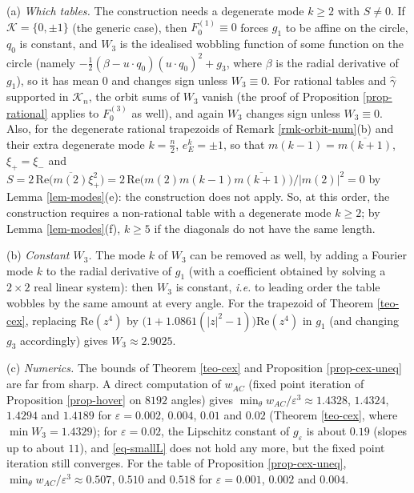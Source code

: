 \documentclass[a4paper,11pt,twoside,leqno]{article}
\newcommand{\ie}[0]{\emph{i.e.} }
\newcommand{\eps}[0]{\varepsilon}
\numberwithin{equation}{section}
\begin{document}
\begin{rmk}\label{rmk-cex-comments}
(a) \emph{Which tables.} The construction needs a degenerate mode $k \geq 2$ with $S \neq 0$. If $\mathcal{K} = \{0, \pm 1\}$ (the generic case), then $F_0^{(1)} \equiv 0$ forces $g_1$ to be affine on the circle, $q_0$ is constant, and $W_3$ is the idealised wobbling function of some function on the circle (namely $-\frac{1}{2}(\beta - u \cdot q_0)(u\cdot q_0)^2 + g_3$, where $\beta$ is the radial derivative of $g_1$), so it has mean $0$ and changes sign unless $W_3 \equiv 0$. For rational tables and $\hat\gamma$ supported in $\mathcal{K}_n$, the orbit sums of $W_3$ vanish (the proof of Proposition \ref{prop-rational} applies to $F_0^{(3)}$ as well), and again $W_3$ changes sign unless $W_3 \equiv 0$. Also, for the degenerate rational trapezoids of Remark \ref{rmk-orbit-num}(b) and their extra degenerate mode $k = \frac{n}{2}$, $e_E^k = \pm 1$, so that $m(k-1) = \overline{m(k+1)}$, $\xi_+ = \xi_-$ and $S = 2\,\mathrm{Re}\big(\overline{m(2)} \xi_+^2\big) = 2\,\mathrm{Re}\big(m(2) m(k-1) \overline{m(k+1)}\big)/|m(2)|^2 = 0$ by Lemma \ref{lem-modes}(e): the construction does not apply. So, at this order, the construction requires a non-rational table with a degenerate mode $k \geq 2$; by Lemma \ref{lem-modes}(f), $k \geq 5$ if the diagonals do not have the same length.

(b) \emph{Constant $W_3$.} The mode $k$ of $W_3$ can be removed as well, by adding a Fourier mode $k$ to the radial derivative of $g_1$ (with a coefficient obtained by solving a $2\times 2$ real linear system): then $W_3$ is constant, \ie to leading order the table wobbles by the same amount at every angle. For the trapezoid of Theorem \ref{teo-cex}, replacing $\mathrm{Re}(z^4)$ by $\big(1 + 1.0861(|z|^2 - 1)\big) \mathrm{Re}(z^4)$ in $g_1$ (and changing $g_3$ accordingly) gives $W_3 \approx 2.9025$.

(c) \emph{Numerics.} The bounds of Theorem \ref{teo-cex} and Proposition \ref{prop-cex-uneq} are far from sharp. A direct computation of $w_{AC}$ (fixed point iteration of Proposition \ref{prop-hover} on $8192$ angles) gives $\min_\theta w_{AC}/\eps^3 \approx 1.4328$, $1.4324$, $1.4294$ and $1.4189$ for $\eps = 0.002$, $0.004$, $0.01$ and $0.02$ (Theorem \ref{teo-cex}, where $\min W_3 = 1.4329$); for $\eps = 0.02$, the Lipschitz constant of $g_\eps$ is about $0.19$ (slopes up to about $11$\textdegree{}), and \eqref{eq-smallL} does not hold any more, but the fixed point iteration still converges. For the table of Proposition \ref{prop-cex-uneq}, $\min_\theta w_{AC}/\eps^3 \approx 0.507$, $0.510$ and $0.518$ for $\eps = 0.001$, $0.002$ and $0.004$.


\end{rmk}
\end{document}
